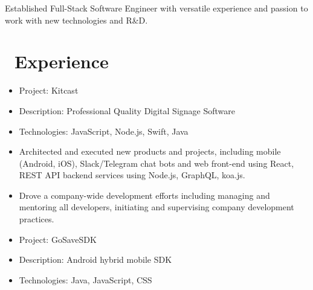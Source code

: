 \documentclass{resume}
\begin{document}



Established Full-Stack Software Engineer with versatile experience and passion to work with new technologies and R\&D.

\section{\faUsers\ Experience}
\role{CTO \& Cofounder}

\begin{itemize}
  \item Project: Kitcast
  \item Description: Professional Quality Digital Signage Software
  \item Technologies: JavaScript, Node.js, Swift, Java
\end{itemize}


\begin{itemize}
  \item Architected and executed new products and projects, including mobile (Android, iOS), Slack/Telegram chat bots and web front-end using React, REST API backend services using Node.js, GraphQL, koa.js.
  \item Drove a company-wide development efforts including managing and mentoring all developers, initiating and supervising company development practices.
\end{itemize}


\begin{itemize}
  \item Project: GoSaveSDK
  \item Description: Android hybrid mobile SDK
  \item Technologies: Java, JavaScript, CSS
\end{itemize}


\end{document}
